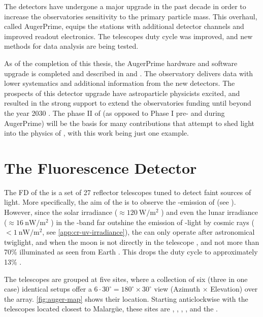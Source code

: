 The detectors have undergone a major upgrade in the past decade in order to 
increase the observatories sensitivity to the primary particle mass. This 
overhaul, called AugerPrime, equips the \SD stations with additional detector 
channels and improved readout electronics. The \FD telescopes duty cycle was 
improved, and new methods for data analysis are being tested.

As of the completion of this thesis, the AugerPrime hardware and software 
upgrade is completed and described in  and 
\cite{collaborationPierreAugerObservatory2011}. The observatory delivers data 
with lower systematics and additional information from the new detectors. The 
prospects of this detector upgrade have astroparticle physicists excited, and 
resulted in the strong support to extend the observatories funding until beyond
the year 2030 \cite{castellinaOutcomeFinanceBoard2023}. The phase II of \DAQ 
(as opposed to Phase I pre- and during AugerPrime) will be the basis for many 
contributions that attempt to shed light into the physics of \UHECRs, with this
work being just one example.

\section{The Fluorescence Detector}
\label{sesee}

The \acf{FD} of the \PAO is a set of 27 reflector telescopes tuned to detect 
faint sources of \UV light. More specifically, the aim of the \FD is to observe
the \UV-emission of \EAS (see ). However, since the 
solar irradiance ($\approx\SI{120}{\watt\per\meter\squared}$ 
\cite{leanContributionUltravioletIrradiance1989}) and even the lunar irradiance 
($\approx\SI{16}{\nano\watt\per\meter\squared}$
\cite{snowAbsoluteUltravioletIrradiance2013}) in the \UV-band far outshine the 
emission of \UV-light by cosmic rays ($<\SI{1}{\nano\watt\per\meter\squared}$, 
see \cref{app:cr-uv-irradiance}), the \FD can only operate after astronomical 
twiglight, and when the moon is not directly in the telescope \FOV, and not
more than 70\% illuminated as seen from Earth \cite{mathesCriteriaFDShift}. 
This drops the duty cycle to approximately 13\% 
\cite{abrahamFluorescenceDetectorPierre2010}.

The telescopes are grouped at five \FD sites, where a collection of six (three
in one case) identical setups offer a $6\cdot30^\circ=180^\circ\times30^\circ$ 
view (Azimuth $\times$ Elevation) over the \SD array. \cref{fig:auger-map} 
shows their location. Starting anticlockwise with the telescopes located 
closest to Malargüe, these sites are \LL, \LM, \LA, , and the \HEAT.

